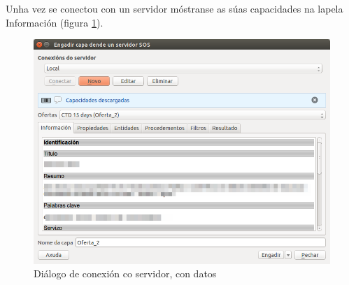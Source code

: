 Unha vez se conectou con un servidor móstranse as súas capacidades na lapela Información (figura \ref{fig:tabInfo}).
\begin{figure}[hbtp]
\centering
\includegraphics[width=\textwidth]{images/manual/tabInfo.png}
\caption{Diálogo de conexión co servidor, con datos}
\label{fig:tabInfo}
\end{figure}

